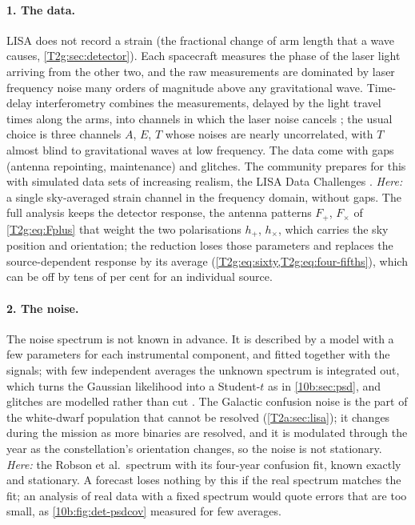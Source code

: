 \paragraph{1. The data.} LISA does not record a strain (the fractional change of arm length that a wave causes,
\cref{T2g:sec:detector}). Each spacecraft measures the phase of the laser light arriving
from the other two, and the raw measurements are dominated by laser frequency noise many orders of magnitude above any
gravitational wave. Time-delay interferometry combines the measurements, delayed by the light travel times along the
arms, into channels in which the laser noise cancels \cite{TintoDhurandhar2005}; the usual choice is three channels
$A$, $E$, $T$ whose noises are nearly uncorrelated, with $T$ almost blind to gravitational waves at low frequency. The
data come with gaps (antenna repointing, maintenance) and glitches. The community prepares for this with simulated
data sets of increasing realism, the LISA Data Challenges \cite{BaghiLDC2022}. \emph{Here:} a single sky-averaged
strain channel in the frequency domain, without gaps. The full analysis keeps the detector response, the antenna patterns $F_+$, $F_\times$ of \eqref{T2g:eq:Fplus}
that weight the two polarisations $h_+$, $h_\times$, which carries the sky position and orientation; the reduction loses
those parameters and replaces the source-dependent response by its average (\cref{T2g:eq:sixty,T2g:eq:four-fifths}), which can be off by tens of per cent for an individual source.

\paragraph{2. The noise.} The noise spectrum is not known in advance. It is described by a model with a few parameters
for each instrumental component, and fitted together with the signals; with few independent averages the unknown
spectrum is integrated out, which turns the Gaussian likelihood into a Student-$t$ \cite{RoverMeyerChristensen2011} as in
\cref{10b:sec:psd}, and glitches are modelled rather than cut \cite{CornishLittenberg2015}. The Galactic confusion noise is
the part of the white-dwarf population that cannot be resolved (\cref{T2a:sec:lisa}); it changes during the mission as more binaries are
resolved, and it is modulated through the year as the constellation's orientation changes, so the noise is not
stationary. \emph{Here:} the Robson et al.\ spectrum with its four-year confusion fit, known exactly and stationary. A
forecast loses nothing by this if the real spectrum matches the fit; an analysis of real data with a fixed spectrum would
quote errors that are too small, as \cref{10b:fig:det-psdcov} measured for few averages.

